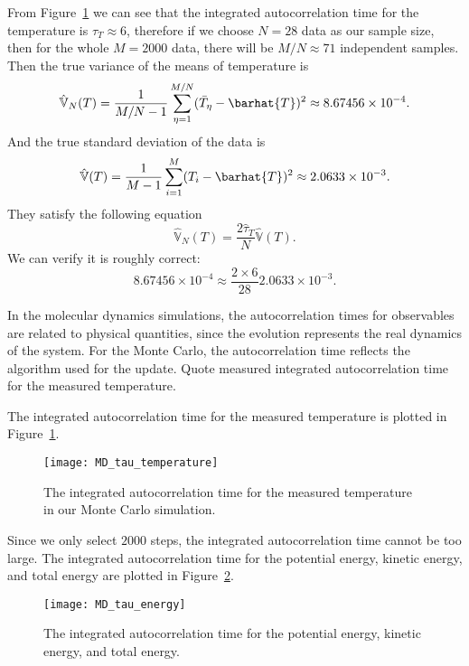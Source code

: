 From Figure~\ref{fig:MD_tau_temperature} we can see that
the integrated autocorrelation time for the temperature is \(\tau_T \approx 6\),
therefore if we choose \(N = 28\) data as our sample size, then for the whole \(M = 2000\)
data, there will be \(M / N \approx 71\) independent samples.
Then the true variance of the means of temperature is
%
\begin{equation}
    \hat{\mathbb{V}}_N(T) = \frac{ 1 }{ M/N - 1 }
    \sum_{\eta=1}^{M/N} (\bar{T}_\eta - \barhat{T})^2 \approx 8.67456 \times 10^{-4}.
\end{equation}
%
And the true standard deviation of the data is
%
\begin{equation}
    \hat{\mathbb{V}}(T) = \frac{1}{M - 1} \sum_{i=1}^M (T_i - \barhat{T})^2
    \approx 2.0633 \times 10^{-3}.
\end{equation}
%
They satisfy the following equation
%
\begin{equation}
    \hat{\mathbb{V}}_N(T) = \frac{ 2 \hat{\tau}_T }{ N } \hat{\mathbb{V}}(T).
\end{equation}
%
We can verify it is roughly correct:
%
\begin{equation}
    8.67456 \times 10^{-4} \approx \frac{2 \times 6}{28} 2.0633 \times 10^{-3}.
\end{equation}

\Question{}
In the molecular dynamics simulations, the autocorrelation times for observables are related
to physical quantities, since the evolution represents the real dynamics of the system. For
the Monte Carlo, the autocorrelation time reflects the algorithm used for the update. Quote
measured integrated autocorrelation time for the measured temperature.

\Answer{}
The integrated autocorrelation time for the measured temperature is plotted in
Figure~\ref{fig:MD_tau_temperature}.

\begin{figure}
    \centering
    \texttt{[image: MD\_tau\_temperature]}
    \caption{The integrated autocorrelation time for the measured temperature
        in our Monte Carlo simulation.}
    \label{fig:MD_tau_temperature}
\end{figure}

Since we only select \(2000\) steps, the integrated autocorrelation time
cannot be too large.
The integrated autocorrelation time for the potential energy, kinetic energy,
and total energy are plotted in Figure~\ref{fig:MD_tau_energy}.

\begin{figure}
    \centering
    \texttt{[image: MD\_tau\_energy]}
    \caption{The integrated autocorrelation time for the potential energy, kinetic energy,
        and total energy.}
    \label{fig:MD_tau_energy}
\end{figure}
